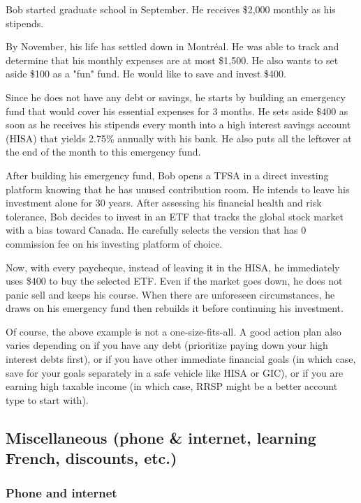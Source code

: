\begin{plaincorollary}

Bob started graduate school in September. He receives \$2,000 monthly as his stipends. 

By November, his life has settled down in Montréal. He was able to track and determine that his monthly expenses are at most \$1,500. He also wants to set aside \$100 as a "fun" fund. He would like to save and invest \$400.

Since he does not have any debt or savings, he starts by building an emergency fund that would cover his essential expenses for 3 months. He sets aside \$400 as soon as he receives his stipends every month into a high interest savings account (HISA) that yields 2.75\% annually with his bank. He also puts all the leftover at the end of the month to this emergency fund.

After building his emergency fund, Bob opens a TFSA in a direct investing platform knowing that he has unused contribution room. He intends to leave his investment alone for 30 years. After assessing his financial health and risk tolerance, Bob decides to invest in an ETF that tracks the global stock market with a bias toward Canada. He carefully selects the version that has 0 commission fee on his investing platform of choice.

Now, with every paycheque, instead of leaving it in the HISA, he immediately uses \$400 to buy the selected ETF. Even if the market goes down, he does not panic sell and keeps his course. When there are unforeseen circumstances, he draws on his emergency fund then rebuilds it before continuing his investment.
\end{plaincorollary}

Of course, the above example is not a one-size-fits-all. A good action plan also varies depending on if you have any debt (prioritize paying down your high interest debts first), or if you have other immediate financial goals (in which case, save for your goals separately in a safe vehicle like HISA or GIC), or if you are earning high taxable income (in which case, RRSP might be a better account type to start with).


\subsection{Miscellaneous (phone \& internet, learning French, discounts, etc.)}

\subsubsection{Phone and internet}  

